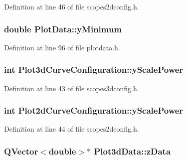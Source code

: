 \-Definition at line 46 of file scopes2dconfig.\-h.

\hypertarget{group___scope_plugin_gabb9422e4f6ced646443b98b6b4304957}{
\subsubsection[{y\-Minimum}]{\setlength{\rightskip}{0pt plus 5cm}double {\bf \-Plot\-Data\-::y\-Minimum}}}\label{group___scope_plugin_gabb9422e4f6ced646443b98b6b4304957}


\-Definition at line 96 of file plotdata.\-h.

\hypertarget{group___scope_plugin_gafedb70e83328587c7a6e336f7899a247}{
\subsubsection[{y\-Scale\-Power}]{\setlength{\rightskip}{0pt plus 5cm}int {\bf \-Plot3d\-Curve\-Configuration\-::y\-Scale\-Power}}}\label{group___scope_plugin_gafedb70e83328587c7a6e336f7899a247}


\-Definition at line 43 of file scopes3dconfig.\-h.

\hypertarget{group___scope_plugin_ga42557670a9e1e7f792d3ecb795387425}{
\subsubsection[{y\-Scale\-Power}]{\setlength{\rightskip}{0pt plus 5cm}int {\bf \-Plot2d\-Curve\-Configuration\-::y\-Scale\-Power}}}\label{group___scope_plugin_ga42557670a9e1e7f792d3ecb795387425}


\-Definition at line 44 of file scopes2dconfig.\-h.

\hypertarget{group___scope_plugin_gad5607d9145f51871817c4094cd1ba250}{
\subsubsection[{z\-Data}]{\setlength{\rightskip}{0pt plus 5cm}\-Q\-Vector$<$double$>$$\ast$ {\bf \-Plot3d\-Data\-::z\-Data}}}\label{group___scope_plugin_gad5607d9145f51871817c4094cd1ba250}


